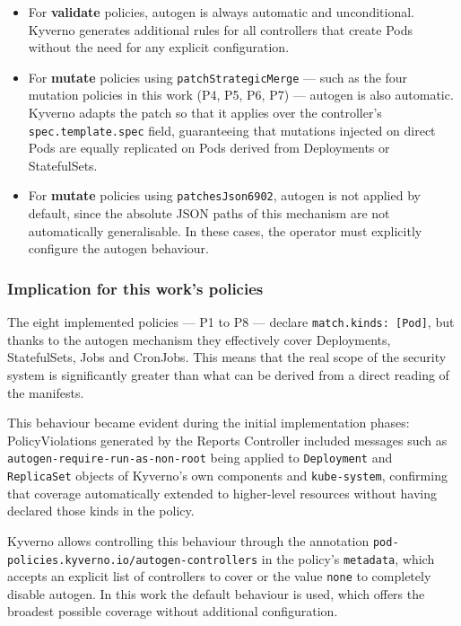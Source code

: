 \begin{itemize}
  \item For \textbf{validate} policies, autogen is always automatic and unconditional. Kyverno generates additional rules for all controllers that create Pods without the need for any explicit configuration.
  \item For \textbf{mutate} policies using \texttt{patchStrategicMerge} --- such as the four mutation policies in this work (P4, P5, P6, P7) --- autogen is also automatic. Kyverno adapts the patch so that it applies over the controller's \texttt{spec.template.spec} field, guaranteeing that mutations injected on direct Pods are equally replicated on Pods derived from Deployments or StatefulSets.
  \item For \textbf{mutate} policies using \texttt{patchesJson6902}, autogen is not applied by default, since the absolute JSON paths of this mechanism are not automatically generalisable. In these cases, the operator must explicitly configure the autogen behaviour.
\end{itemize}

\subsubsection*{Implication for this work's policies}

The eight implemented policies --- P1 to P8 --- declare \texttt{match.kinds:\,[Pod]}, but thanks to the autogen mechanism they effectively cover Deployments, StatefulSets, Jobs and CronJobs. This means that the real scope of the security system is significantly greater than what can be derived from a direct reading of the manifests.

This behaviour became evident during the initial implementation phases: PolicyViolations generated by the Reports Controller included messages such as \texttt{autogen-require-run-as-non-root} being applied to \texttt{Deployment} and \texttt{ReplicaSet} objects of Kyverno's own components and \texttt{kube-system}, confirming that coverage automatically extended to higher-level resources without having declared those kinds in the policy.

Kyverno allows controlling this behaviour through the annotation \texttt{pod-policies.kyverno.io/\allowbreak{}autogen-controllers} in the policy's \texttt{metadata}, which accepts an explicit list of controllers to cover or the value \texttt{none} to completely disable autogen. In this work the default behaviour is used, which offers the broadest possible coverage without additional configuration.

